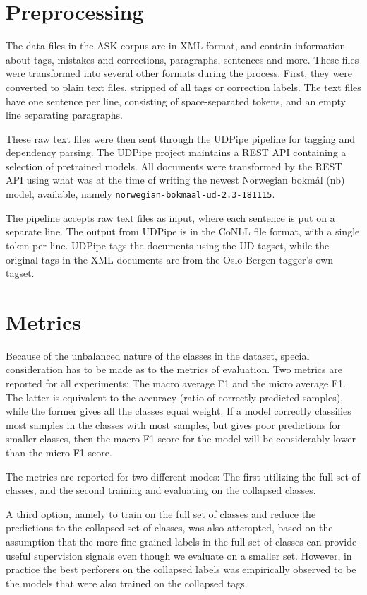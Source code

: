 
\section{Preprocessing}

The data files in the ASK corpus are in XML format, and contain information
about tags, mistakes and corrections, paragraphs, sentences and more. These
files were transformed into several other formats during the process. First,
they were converted to plain text files, stripped of all tags or correction
labels. The text files have one sentence per line, consisting of
space-separated tokens, and an empty line separating paragraphs.

These raw text files were then sent through the UDPipe pipeline
\autocite{udpipe:2017} for tagging and dependency parsing. The UDPipe
project maintains a REST API containing a selection of pretrained models.
All documents were transformed by the REST API using what was at the time 
of writing the
newest Norwegian bokmål (nb) model, available, namely
\texttt{norwegian-bokmaal-ud-2.3-181115}.

The pipeline accepts raw text files as input, where each sentence is put on a
separate line. The output from UDPipe is in the CoNLL file format, with a
single token per line. UDPipe tags the documents using the UD tagset, while
the original tags in the XML documents are from the Oslo-Bergen tagger's own
tagset.

\section{Metrics}

Because of the unbalanced nature of the classes in the dataset, special
consideration has to be made as to the metrics of evaluation. Two metrics are
reported for all experiments: The macro average F1 and the micro average F1.
The latter is equivalent to the accuracy (ratio of correctly predicted
samples), while the former gives all the classes equal weight. If a model
correctly classifies most samples in the classes with most samples, but gives
poor predictions for smaller classes, then the macro F1 score for the model
will be considerably lower than the micro F1 score.

The metrics are reported for two different modes: The first utilizing the
full set of classes, and the second training and evaluating on the collapsed
classes.

A third option, namely to train on the full set of classes and reduce the
predictions to the collapsed set of classes, was also attempted, based on the
assumption that the more fine grained labels in the full set of classes can
provide useful supervision signals even though we evaluate on a smaller set.
However, in practice the best perforers on the collapsed labels was
empirically observed to be the models that were also trained on the collapsed
tags.

